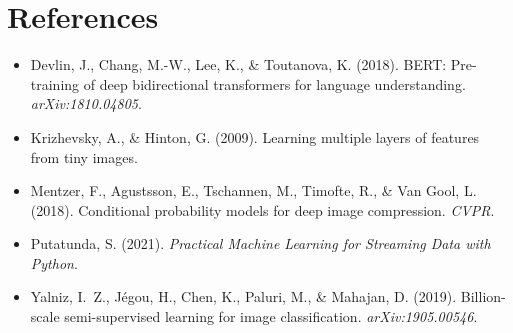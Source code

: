 \documentclass[11pt]{article}
\begin{document}
\section*{References}
\begin{itemize}[nosep]
  \item Devlin, J., Chang, M.-W., Lee, K., \& Toutanova, K. (2018). BERT:
        Pre-training of deep bidirectional transformers for language
        understanding. \emph{arXiv:1810.04805}.
  \item Krizhevsky, A., \& Hinton, G. (2009). Learning multiple layers of
        features from tiny images.
  \item Mentzer, F., Agustsson, E., Tschannen, M., Timofte, R., \& Van Gool,
        L. (2018). Conditional probability models for deep image
        compression. \emph{CVPR}.
  \item Putatunda, S. (2021). \emph{Practical Machine Learning for Streaming
        Data with Python}.
  \item Yalniz, I.~Z., J\'egou, H., Chen, K., Paluri, M., \& Mahajan, D.
        (2019). Billion-scale semi-supervised learning for image
        classification. \emph{arXiv:1905.00546}.
\end{itemize}
\end{document}

